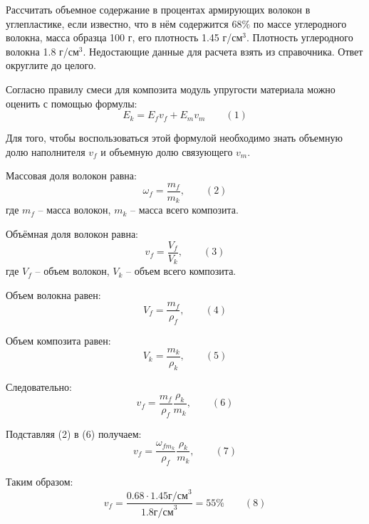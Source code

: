 
Рассчитать объемное содержание в процентах
армирующих волокон в углепластике, если известно, что в нём содержится $68\%$ по
массе углеродного волокна, масса образца 100 г, его плотность 1.45 г/см$^3$.
Плотность углеродного волокна 1.8 г/см$^3$. Недостающие данные для
расчета взять из справочника. Ответ округлите до целого.

\solutionSection

Согласно правилу смеси для композита модуль упругости материала можно оценить с помощью формулы:
$$E_k=E_f v_f+E_m v_m \qquad (1)$$

Для того, чтобы воспользоваться этой формулой необходимо знать 
объемную долю наполнителя $v_f$ и объемную долю связующего $v_m$.

Массовая доля волокон равна:
$$\omega_f=\frac{m_f}{m_k}, \qquad (2)$$
где $m_f$ – масса волокон, $m_k$ – масса всего композита.

Объёмная доля волокон равна:
$$v_f=\frac{V_f}{V_k}, \qquad (3)$$
где $V_f$ – объем волокон, $V_k$ – объем всего композита.

Объем волокна равен:
$$V_f=\frac{m_f}{\rho_f}, \qquad (4)$$

Объем композита равен:
$$V_k=\frac{m_k}{\rho_k}, \qquad (5)$$

Следовательно:
$$v_f=\frac{m_f}{\rho_f}   \frac{\rho_k}{m_k}, \qquad (6)$$

Подставляя (2) в (6) получаем:
$$v_f=\frac{\omega_{fm_k}}{\rho_f} \frac{\rho_k}{m_k}, \qquad (7)$$

Таким образом:
$$v_f = \frac{0.68 \cdot 1.45\text{г/см}^3}{1.8 \text{г/см}^3}=55\% \qquad (8)$$

